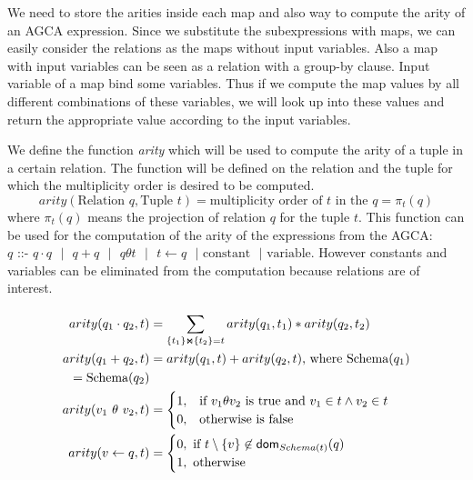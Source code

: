 \documentclass[12pt]{article}
\begin{document}
We need to store the arities inside each map and also way to compute the arity of an AGCA expression. Since we substitute the subexpressions with maps, we can easily consider the relations as the maps without input variables. Also a map with input variables can be seen as a relation with a group-by clause. Input variable of a map bind some variables. Thus if we compute the map values by all different combinations of these variables, we will look up into these values and return the appropriate value according to the input variables.  

We define the function \emph{arity} which will be used to compute the arity of a tuple in a certain relation. The function will be defined on the relation and the tuple for which the multiplicity order is desired to be computed. $$arity(\text{Relation } q,\text{Tuple } t)=\text{multiplicity order of }t\text{ in the } q =\pi_{t}(q)$$ where $\pi_{t}(q)$ means the projection of relation $q$ for the tuple $t$. This function can be used for the computation of the arity of the expressions from the AGCA: $q\text{ ::- }q\cdot q\text{ }|\text{ }q+q\text{ }|\text{ }q \theta t\text{ }|\text{ }t\gets q\text{ }|\text{ constant}\text{ }|\text{ variable}$. However constants and variables can be eliminated from the computation because relations are of interest.

\begin{align}
arity(q_{1}\cdot q_{2},t)&=\sum\limits_{\{t_{1}\}\Join \{t_{2}\}={t}}^{}arity(q_{1},t_{1})*arity(q_{2},t_{2})\\
arity(q_{1} + q_{2},t)&=arity(q_{1},t)+arity(q_{2},t)\text{, where Schema}(q_{1})\\=\text{Schema}(q_{2})\\
arity(v_1\text{ } \theta \text{ } v_2,t)&=\begin{cases}1,& \mbox{if } v_1\theta v_2 \mbox{ is true and }v_{1}\in t \land v_{2}\in t\\
0,& \text{otherwise} \mbox{ is false} 
\end{cases}\\
arity(v\gets q,t)&=\begin{cases}0, \mbox{ if $t\setminus\{v\}\not\in \text{\textsf{dom}}_{Schema(t)}(q)$}\\ 1, \mbox{ otherwise} \end{cases}
\end{align}
\end{document}
